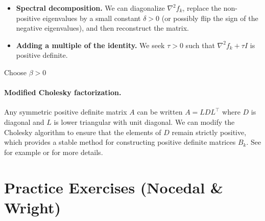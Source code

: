 \begin{itemize}
    \item \textbf{Spectral decomposition.} We can diagonalize $\nabla^2 f_k$,
    replace the non-positive eigenvalues by a small constant $\delta>0$
    (or possibly flip the sign of the negative eigenvalues), and then
    reconstruct the matrix.
    \item \textbf{Adding a multiple of the identity.} We seek $\tau>0$ such that
    $\nabla^2 f_k + \tau I$ is positive definite.
\end{itemize}

\begin{algorithm}[H]
\caption{Cholesky with addition of a multiple of the identity}
\label{alg:Cholesky-identity}
Choose $\beta > 0$\;
\end{algorithm}

\paragraph{Modified Cholesky factorization.}

Any symmetric positive definite matrix $A$ can be written $A = LDL^\top$ where
$D$ is diagonal and $L$ is lower triangular with unit diagonal.
We can modify the Cholesky algorithm to ensure that the elements of $D$
remain strictly positive, which provides a stable method for constructing
positive definite matrices $B_k$. See for example \cite{gill2019practical}
or \cite{more1982newton} for more details.

\section{Practice Exercises (Nocedal \& Wright)}
\label{sec:2.exercises}

